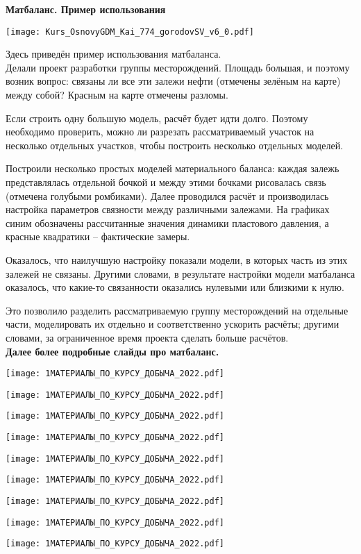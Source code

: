 \textbf{Матбаланс. Пример использования}

\texttt{[image: Kurs\_OsnovyGDM\_Kai\_774\_gorodovSV\_v6\_0.pdf]}

Здесь приведён пример использования матбаланса.
\\

Делали проект разработки группы месторождений.
Площадь большая, и поэтому возник вопрос: связаны ли все эти залежи нефти (отмечены зелёным на карте) между собой?
Красным на карте отмечены разломы.

Если строить одну большую модель, расчёт будет идти долго. Поэтому необходимо проверить, можно ли разрезать рассматриваемый участок на несколько отдельных участков, чтобы построить несколько отдельных моделей.

Построили несколько простых моделей материального баланса: каждая залежь представлялась отдельной бочкой и между этими бочками рисовалась связь (отмечена голубыми ромбиками). Далее проводился расчёт и производилась настройка параметров связности между различными залежами.
На графиках синим обозначены рассчитанные значения динамики пластового давления, а красные квадратики -- фактические замеры.

Оказалось, что наилучшую настройку показали модели, в которых часть из этих залежей не связаны.
Другими словами, в результате настройки модели матбаланса оказалось, что какие-то связанности оказались нулевыми или близкими к нулю.

Это позволило разделить рассматриваемую группу месторождений на отдельные части, моделировать их отдельно и соответственно ускорить расчёты; другими словами, за ограниченное время проекта сделать больше расчётов.
\\

\textbf{Далее более подробные слайды про матбаланс.}

\texttt{[image: 1МАТЕРИАЛЫ\_ПО\_КУРСУ\_ДОБЫЧА\_2022.pdf]}

\texttt{[image: 1МАТЕРИАЛЫ\_ПО\_КУРСУ\_ДОБЫЧА\_2022.pdf]}

\texttt{[image: 1МАТЕРИАЛЫ\_ПО\_КУРСУ\_ДОБЫЧА\_2022.pdf]}

\texttt{[image: 1МАТЕРИАЛЫ\_ПО\_КУРСУ\_ДОБЫЧА\_2022.pdf]}

\texttt{[image: 1МАТЕРИАЛЫ\_ПО\_КУРСУ\_ДОБЫЧА\_2022.pdf]}

\texttt{[image: 1МАТЕРИАЛЫ\_ПО\_КУРСУ\_ДОБЫЧА\_2022.pdf]}

\texttt{[image: 1МАТЕРИАЛЫ\_ПО\_КУРСУ\_ДОБЫЧА\_2022.pdf]}

\texttt{[image: 1МАТЕРИАЛЫ\_ПО\_КУРСУ\_ДОБЫЧА\_2022.pdf]}

\texttt{[image: 1МАТЕРИАЛЫ\_ПО\_КУРСУ\_ДОБЫЧА\_2022.pdf]}

